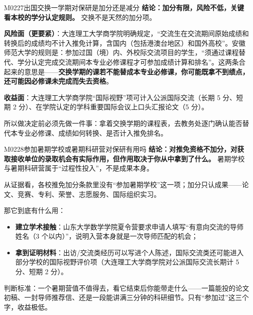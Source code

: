 \begin{qa}{M0227}{出国交换一学期对保研是加分还是减分}
\textbf{结论：加分有限，风险不低，关键看本校的学分认定规则。} 交换不是天然的加分项。

\textbf{风险面（更要紧）}：大连理工大学商学院明确规定，“交流生在交流期间原始成绩和转换后的成绩均不计入推免计算，含国内（包括港澳台地区）和国外高校”。安徽师范大学的规则是：参加过国（境）内、外校际交流项目的学生，“须通过课程替代、学分认定完成交流期间本专业必修课程才可参加成绩计算和排名”。这两条合起来的意思是——\textbf{交换学期的课若不能替成本专业必修课，你可能既拿不到绩点，还可能因必修课未完成而失去资格}。

\textbf{收益面}：大连理工大学商学院“国际视野”项可计入公派国际交流（长期 5 分、短期 2 分）、在学院认定的学科重要国际会议上口头汇报论文（5 分）。

所以做决定前必须先做一件事：拿着交换学期的课程表，去教务处逐门确认能否替代本专业必修课、成绩如何转换、是否计入推免排名。
\end{qa}

\begin{qa}{M0228}{参加暑期学校或暑期科研营对保研有用吗}
\textbf{结论：对推免资格不加分，对获取接收单位的录取机会有实际作用，但作用取决于你从中拿到了什么。} 暑期学校与暑期科研营属于“过程性投入”，不是成果本身。

从证据看，各校推免加分条款里没有“参加暑期学校”这一项；加分只认成果——论文、竞赛、专利、荣誉、志愿服务、国际组织实习。

那它到底有什么用：
\begin{itemize}
  \item \textbf{建立学术接触}：山东大学数学学院夏令营要求申请人填写“有意向交流的导师姓名（3 个以内）”，说明入营本身就是一次导师匹配的机会；
  \item \textbf{拿到证明材料}：出访/交流类经历可以写进个人陈述，国际交流类还可能进入部分学校的国际视野评价项（大连理工大学商学院对公派国际交流长期计 5 分、短期 2 分）。
\end{itemize}

判断标准：一个暑期营值不值得去，看它结束后你能带走什么——一篇能投的论文初稿、一封导师推荐信、还是一段能讲满三分钟的科研细节。只有“参加过”这三个字，收益极低。
\end{qa}

